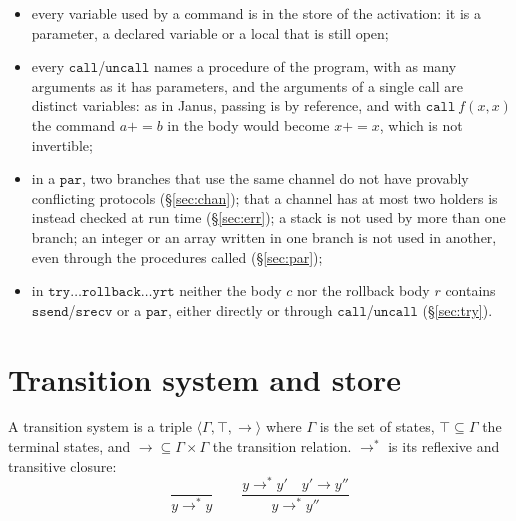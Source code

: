 \begin{itemize}
    $\mathtt{local}$ or $\mathtt{delocal}$ is an integer for integers and arrays,
    $\mathtt{nil}$ for a stack, $\mathtt{empty}$ for a channel;
  \item every variable used by a command is in the store of the activation: it is a
    parameter, a declared variable or a local that is still open;
  \item every $\mathtt{call}$/$\mathtt{uncall}$ names a procedure of the
    program, with as many arguments as it has parameters, and the arguments
    of a single call are distinct variables: as in Janus, passing is
    by reference, and with $\mathtt{call}\ f(x, x)$ the command $a \mathbin{+\!\!=} b$
    in the body would become $x \mathbin{+\!\!=} x$, which is not invertible;
  \item in a $\mathtt{par}$, two branches that use the same channel do not have
    provably conflicting protocols (\S\ref{sec:chan}); that a channel
    has at most two holders is instead checked at run time
    (\S\ref{sec:err}); a stack is not used by more than one branch; an integer or an
    array written in one branch is not used in another, even through the
    procedures called (\S\ref{sec:par});
  \item in $\mathtt{try}\ldots\mathtt{rollback}\ldots\mathtt{yrt}$ neither the body
    $c$ nor the rollback body $r$ contains $\mathtt{ssend}$/$\mathtt{srecv}$
    or a $\mathtt{par}$, either directly or through
    $\mathtt{call}$/$\mathtt{uncall}$ (\S\ref{sec:try}).
\end{itemize}

\section{Transition system and store}
\label{sec:store}

A transition system is a triple $\langle \Gamma, \top, \to \rangle$ where
$\Gamma$ is the set of states, $\top \subseteq \Gamma$ the terminal states, and
${\to} \subseteq \Gamma \times \Gamma$ the transition relation. $\to^*$ is its
reflexive and transitive closure:
\[
\dfrac{}{y \to^* y}
\qquad
\dfrac{y \to^* y' \quad y' \to y''}{y \to^* y''}
\]

